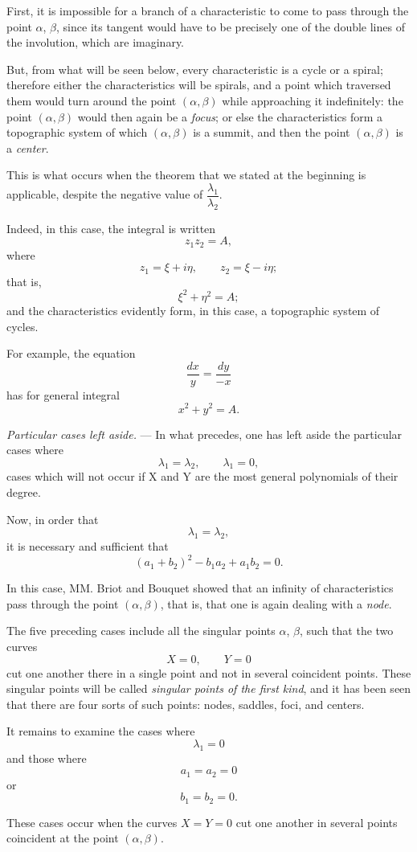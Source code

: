 \documentclass[11pt]{article}
\begin{document}
First, it is impossible for a branch of a characteristic to come to pass through the point $\alpha$, $\beta$, since its tangent would have to be precisely one of the double lines of the involution, which are imaginary.

But, from what will be seen below, every characteristic is a cycle or a spiral; therefore either the characteristics will be spirals, and a point which traversed them would turn around the point $(\alpha,\beta)$ while approaching it indefinitely: the point $(\alpha,\beta)$ would then again be a \emph{focus}; or else the characteristics form a topographic system of which $(\alpha,\beta)$ is a summit, and then the point $(\alpha,\beta)$ is a \emph{center}.

This is what occurs when the theorem that we stated at the beginning is applicable, despite the negative value of $\dfrac{\lambda_1}{\lambda_2}$.

Indeed, in this case, the integral is written
\[
z_1z_2=A,
\]
where
\[
z_1=\xi+i\eta,
\qquad
z_2=\xi-i\eta;
\]
that is,
\[
\xi^2+\eta^2=A;
\]
and the characteristics evidently form, in this case, a topographic system of cycles.

For example, the equation
\[
\frac{dx}{y}=\frac{dy}{-x}
\]
has for general integral
\[
x^2+y^2=A.
\]

\emph{Particular cases left aside.} --- In what precedes, one has left aside the particular cases where
\[
\lambda_1=\lambda_2,
\qquad
\lambda_1=0,
\]
cases which will not occur if X and Y are the most general polynomials of their degree.

Now, in order that
\[
\lambda_1=\lambda_2,
\]
it is necessary and sufficient that
\[
(a_1+b_2)^2-b_1a_2+a_1b_2=0.
\]

In this case, MM. Briot and Bouquet showed that an infinity of characteristics pass through the point $(\alpha,\beta)$, that is, that one is again dealing with a \emph{node}.

The five preceding cases include all the singular points $\alpha$, $\beta$, such that the two curves
\[
X=0,\qquad Y=0
\]
cut one another there in a single point and not in several coincident points. These singular points will be called \emph{singular points of the first kind}, and it has been seen that there are four sorts of such points: nodes, saddles, foci, and centers.

It remains to examine the cases where
\[
\lambda_1=0
\]
and those where
\[
a_1=a_2=0
\]
or
\[
b_1=b_2=0.
\]

These cases occur when the curves $X=Y=0$ cut one another in several points coincident at the point $(\alpha,\beta)$.
\end{document}
